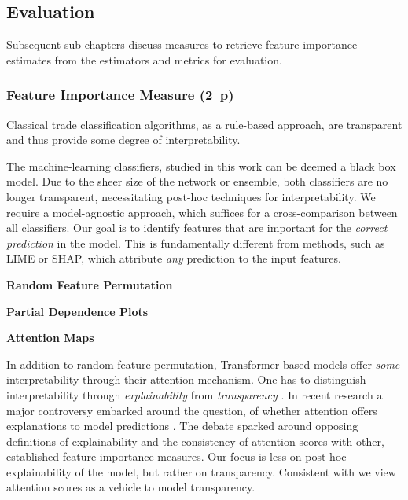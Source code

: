 \subsection{Evaluation}\label{sec:evaluation}

Subsequent sub-chapters discuss measures to retrieve feature importance estimates from the estimators and metrics for evaluation.

\subsubsection{Feature Importance
    Measure (2~p)}\label{sec:feature-importance-measure}

Classical trade classification algorithms, as a rule-based approach, are transparent and thus provide some degree of interpretability.

The machine-learning classifiers, studied in this work can be deemed a black box model. Due to the sheer size of the network or ensemble, both classifiers are no longer transparent, necessitating post-hoc techniques for interpretability. We require a model-agnostic approach, which suffices for a cross-comparison between all classifiers. Our goal is to identify features that are important for the \emph{correct prediction} in the model. This is fundamentally different from methods, such as LIME or SHAP, which attribute \emph{any} prediction to the input features.

\textbf{Random Feature Permutation}


\textbf{Partial Dependence Plots}

\textbf{Attention Maps}

In addition to random feature permutation, Transformer-based models offer \emph{some} interpretability through their attention mechanism. One has to distinguish interpretability through \emph{explainability} from \emph{transparency} \autocite[][4--5]{liptonMythosModelInterpretability2017}. In recent research a major controversy embarked around the question, of whether attention offers explanations to model predictions \autocites[cp.][150]{bastingsElephantInterpretabilityRoom2020}[][5--7]{jainAttentionNotExplanation2019}[][9]{wiegreffeAttentionNotNot2019}. The debate sparked around opposing definitions of explainability and the consistency of attention scores with other, established feature-importance measures. Our focus is less on post-hoc explainability of the model, but rather on transparency. Consistent with \textcite[][8]{wiegreffeAttentionNotNot2019} we view attention scores as a vehicle to model transparency.

